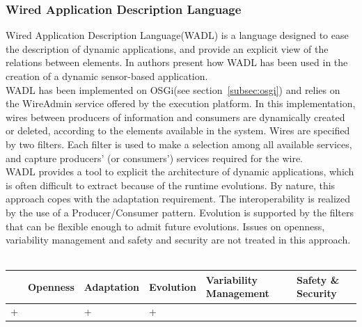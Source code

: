 \subsubsection{Wired Application Description Language}
Wired Application Description Language(WADL) is a language designed to ease the description of dynamic applications, and provide an explicit view of the relations between elements. In \cite{Cervantes:2008} authors present how WADL has been used in the creation of a dynamic sensor-based application.\\
WADL has been implemented on OSGi(see section~\ref{subsec:osgi}) and relies on the WireAdmin service offered by the execution platform. In this implementation, wires between producers of information and consumers are dynamically created or deleted, according to the elements available in the system. Wires are specified by two filters. Each filter is used to make a selection among all available services, and capture producers' (or consumers') services required for the wire.\\

WADL provides a tool to explicit the architecture of dynamic applications, which is often difficult to extract because of the runtime evolutions. By nature, this approach copes with the adaptation requirement. The interoperability is realized by the use of a Producer/Consumer pattern. Evolution is supported by the filters that can be flexible enough to admit future evolutions. Issues on openness, variability management and safety and security are not treated in this approach.\\
\\
\begin{tabular}{ >{\centering}m{}| >{\centering}m{} >{\centering}m{}| >{\centering}m{} >{\centering}m{}| >{\centering\arraybackslash}m{}}
{\tiny Interoperability} & {\tiny Openness} & {\tiny Adaptation} & {\tiny Evolution} & {\tiny Variability Management} & {\tiny Safety \& Security}\\
 \hline
 + &  & + & + &  & \\ 
  \hline
\end{tabular}\\


